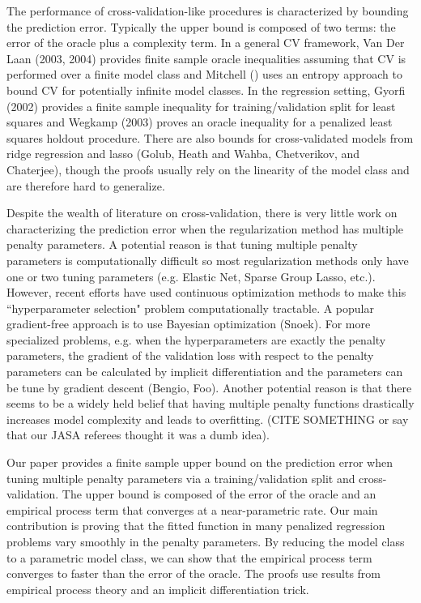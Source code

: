 \documentclass[12pt]{article}
\begin{document}
The performance of cross-validation-like procedures is characterized by bounding the prediction error. Typically the upper bound is composed of two terms: the error of the oracle plus a complexity term. In a general CV framework, Van Der Laan (2003, 2004) provides finite sample oracle inequalities assuming that CV is performed over a finite model class and Mitchell () uses an entropy approach to bound CV for potentially infinite model classes. In the regression setting, Gyorfi (2002) provides a finite sample inequality for training/validation split for least squares and Wegkamp (2003) proves an oracle inequality for a penalized least squares holdout procedure. There are also bounds for cross-validated models from ridge regression and lasso (Golub, Heath and Wahba, Chetverikov, and Chaterjee), though the proofs usually rely on the linearity of the model class and are therefore hard to generalize.

Despite the wealth of literature on cross-validation, there is very little work on characterizing the prediction error when the regularization method has multiple penalty parameters. A potential reason is that tuning multiple penalty parameters is computationally difficult so most regularization methods only have one or two tuning parameters (e.g. Elastic Net, Sparse Group Lasso, etc.). However, recent efforts have used continuous optimization methods to make this ``hyperparameter selection" problem computationally tractable. A popular gradient-free approach is to use Bayesian optimization (Snoek). For more specialized problems, e.g. when the hyperparameters are exactly the penalty parameters, the gradient of the validation loss with respect to the penalty parameters can be calculated by implicit differentiation and the parameters can be tune by gradient descent (Bengio, Foo).  Another potential reason is that there seems to be a widely held belief that having multiple penalty functions drastically increases model complexity and leads to overfitting. (CITE SOMETHING or say that our JASA referees thought it was a dumb idea).

Our paper provides a finite sample upper bound on the prediction error when tuning multiple penalty parameters via a training/validation split and cross-validation. The upper bound is composed of the error of the oracle and an empirical process term that converges at a near-parametric rate. Our main contribution is proving that the fitted function in many penalized regression problems vary smoothly in the penalty parameters. By reducing the model class to a parametric model class, we can show that the empirical process term converges to faster than the error of the oracle. The proofs use results from empirical process theory and an implicit differentiation trick.
\end{document}
